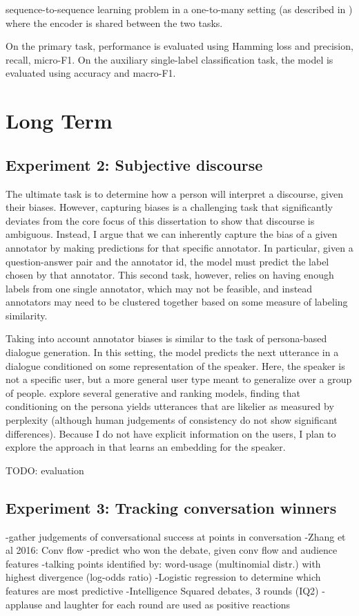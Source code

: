 sequence-to-sequence learning problem in a one-to-many setting (as described in \citet{Luong:2015}) where the encoder is shared between the two tasks.

On the primary task, performance is evaluated using Hamming loss and precision, recall, micro-F1. On the auxiliary single-label classification task, the model is evaluated using accuracy and macro-F1.


\section{Long Term} 
\subsection{Experiment 2: Subjective discourse} The ultimate task is to determine how a person will interpret a discourse, given their biases. However, capturing biases is a  challenging task that significantly deviates from the core focus of this dissertation to show that discourse is ambiguous. Instead, I argue that we can inherently capture the bias of a given annotator by making predictions for that specific annotator. In particular, given a question-answer pair and the annotator id, the model must predict the label chosen by that annotator. This second task, however, relies on having enough labels from one single annotator, which may not be feasible, and instead annotators may need to be clustered together based on some measure of labeling similarity.

 Taking into account annotator biases is similar to the task of persona-based dialogue generation. In this setting, the model predicts the next utterance in a dialogue conditioned on some representation of the speaker. Here, the speaker is not a specific user, but a more general user type meant to generalize over a group of people. \citet{Zhang:2018} explore several generative and ranking models, finding that conditioning on the persona yields utterances that are likelier as measured by perplexity (although human judgements of consistency do not show significant differences). Because I do not have explicit information on the users, I plan to explore the approach in \citet{Li:2016} that learns an embedding for the speaker.

TODO: evaluation

\subsection{Experiment 3: Tracking conversation winners} 
-gather judgements of conversational success at points in conversation
-Zhang et al 2016: Conv flow
-predict who won the debate, given conv flow and audience features
-talking points identified by: word-usage (multinomial distr.) with highest divergence (log-odds ratio)
-Logistic regression to determine which features are most predictive
-Intelligence Squared debates, 3 rounds (IQ2)
-applause and laughter for each round are used as positive reactions


